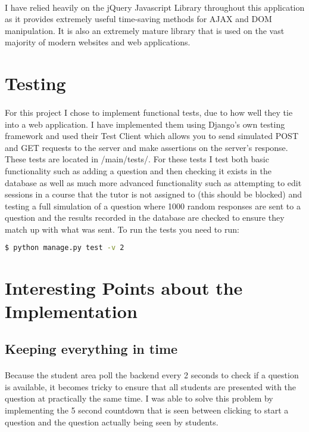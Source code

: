 \documentclass[10pt]{report}
\begin{document}
    \paragraph{}
    I have relied heavily on the jQuery Javascript Library throughout this application as it provides
    extremely useful time-saving methods for AJAX and DOM manipulation.  It is also an extremely mature
    library that is used on the vast majority of modern websites and web applications.
    
    \section*{Testing}
    \paragraph{}
    For this project I chose to implement functional tests, due to how well they tie into a web
    application.  I have implemented them using Django's own testing framework and used their Test Client
    which allows you to send simulated POST and GET requests to the server and make assertions on the
    server's response.  These tests are located in /main/tests/.  For these tests I test both basic
    functionality such as adding a question and then checking it exists in the database as well as much
    more advanced functionality such as attempting to edit sessions in a course that the tutor is not
    assigned to (this should be blocked) and testing a full simulation of a question where 1000 random
    responses are sent to a question and the results recorded in the database are checked to ensure they
    match up with what was sent.  To run the tests you need to run:
    \begin{lstlisting}[language=bash]
    	$ python manage.py test -v 2
    \end{lstlisting}
    
	\section*{Interesting Points about the Implementation}
	\subsection*{Keeping everything in time}
	\paragraph{}
	Because the student area poll the backend every 2 seconds to check if a question is available, it
	becomes tricky to ensure that all students are presented with the question at practically the
	same time.  I was able to solve this problem by implementing the 5 second countdown that is seen
	between clicking to start a question and the question actually being seen by students.
	
\end{document}
